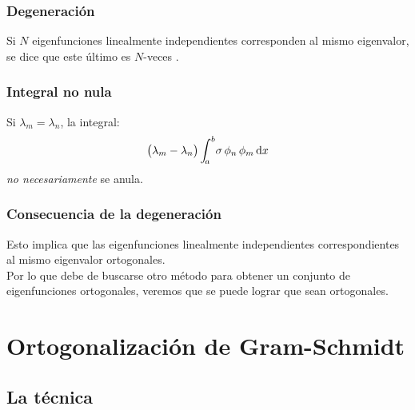 \documentclass[12pt]{beamer}
\begin{document}
\begin{frame}
\frametitle{Degeneración}
Si $N$ eigenfunciones linealmente independientes corresponden al mismo eigenvalor, se dice que este último es $N$-veces .
\end{frame}
\begin{frame}
\frametitle{Integral no nula}
Si $\lambda_{m} = \lambda_{n}$, la integral:
\pause
\begin{align*}
\big( \lambda_{m} - \lambda_{n} \big) \, \scaleint{5ex}_{\bs a}^{b} \sigma \, \phi_{n} \, \phi_{m} \dd{x}
\end{align*}
\emph{no necesariamente} se anula.
\end{frame}
\begin{frame}
\frametitle{Consecuencia de la degeneración}
Esto implica que las eigenfunciones linealmente independientes correspondientes al mismo eigenvalor  ortogonales.
\\
\bigskip
\pause
Por lo que debe de buscarse otro método para obtener un conjunto de eigenfunciones ortogonales, \pause veremos que  se puede lograr que sean ortogonales.
\end{frame}

\section{Ortogonalización de Gram-Schmidt}
\subsection{La técnica}
\end{document}
